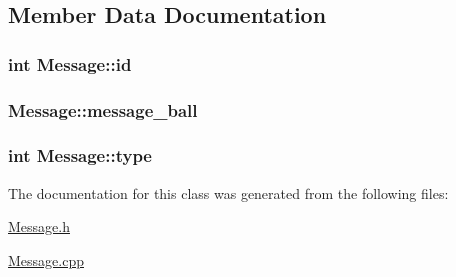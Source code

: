 \subsection{Member Data Documentation}
\hypertarget{classMessage_ab1d21c0ed16844f0d643acf6e85cdae3}{
\subsubsection[{id}]{\setlength{\rightskip}{0pt plus 5cm}int Message\+::id\hspace{0.3cm}{\ttfamily [private]}}}\label{classMessage_ab1d21c0ed16844f0d643acf6e85cdae3}
\hypertarget{classMessage_a391ccb84ba4fe69bf4f172952545f2bb}{
\subsubsection[{message\+\_\+ball}]{ Message\+::message\+\_\+ball\hspace{0.3cm}{\ttfamily [private]}}}\label{classMessage_a391ccb84ba4fe69bf4f172952545f2bb}
\hypertarget{classMessage_afbfb481c98b13d0deba0bac443bebe29}{
\subsubsection[{type}]{\setlength{\rightskip}{0pt plus 5cm}int Message\+::type\hspace{0.3cm}{\ttfamily [private]}}}\label{classMessage_afbfb481c98b13d0deba0bac443bebe29}


The documentation for this class was generated from the following files\+:\begin{DoxyCompactItemize}
\item 
\hyperlink{Message_8h}{Message.\+h}\item 
\hyperlink{Message_8cpp}{Message.\+cpp}\end{DoxyCompactItemize}
